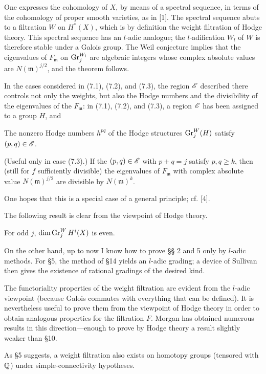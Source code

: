 \ProofHeadEN One expresses the cohomology of \(X\), by means of a spectral sequence, in terms of the cohomology of proper smooth varieties, as in [1]. The spectral sequence abuts to a filtration \(W\) on \(H^*(X)\), which is by definition the weight filtration of Hodge theory. This spectral sequence has an \(l\)-adic analogue; the \(l\)-adification \(W_l\) of \(W\) is therefore stable under a Galois group. The Weil conjecture implies that the eigenvalues of \(F_{\mathfrak m}\) on \(\operatorname{Gr}_j^{W_l}\) are algebraic integers whose complex absolute values are \(N(\mathfrak m)^{j/2}\), and the theorem follows.

 In the cases considered in (7.1), (7.2), and (7.3), the region \(\mathscr{E}\) described there controls not only the weights, but also the Hodge numbers and the divisibility of the eigenvalues of the \(F_{\mathfrak m}\): in (7.1), (7.2), and (7.3), a region \(\mathscr{E}\) has been assigned to a group \(H\), and

 The nonzero Hodge numbers \(h^{pq}\) of the Hodge structures \(\operatorname{Gr}_j^W(H)\) satisfy \((p,q)\in\mathscr{E}\).

 (Useful only in case (7.3).) If the \((p,q)\in\mathscr{E}\) with \(p+q=j\) satisfy \(p,q\ge k\), then (still for \(f\) sufficiently divisible) the eigenvalues of \(F_{\mathfrak m}\) with complex absolute value \(N(\mathfrak m)^{j/2}\) are divisible by \(N(\mathfrak m)^k\).

One hopes that this is a special case of a general principle; cf. [4].

 The following result is clear from the viewpoint of Hodge theory.

 For odd \(j\), \(\dim\operatorname{Gr}_j^W H^i(X)\) is even.

On the other hand, up to now I know how to prove §§ 2 and 5 only by \(l\)-adic methods. For §5, the method of §14 yields an \(l\)-adic grading; a device of Sullivan then gives the existence of rational gradings of the desired kind.

The functoriality properties of the weight filtration are evident from the \(l\)-adic viewpoint (because Galois commutes with everything that can be defined). It is nevertheless useful to prove them from the viewpoint of Hodge theory in order to obtain analogous properties for the filtration \(F\). Morgan has obtained numerous results in this direction---enough to prove by Hodge theory a result slightly weaker than §10.

 As §5 suggests, a weight filtration also exists on homotopy groups (tensored with \(\mathbb{Q}\)) under simple-connectivity hypotheses.

